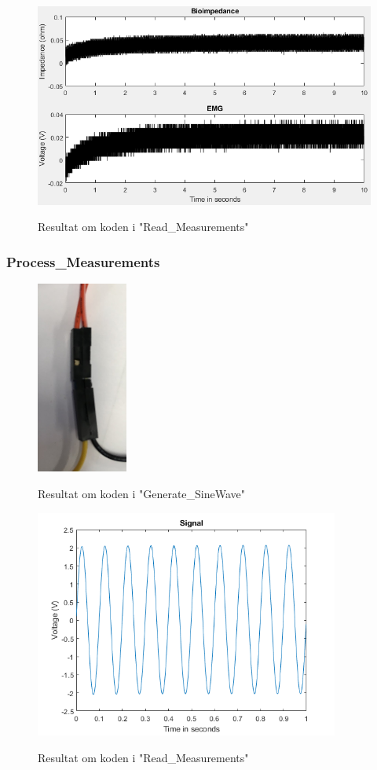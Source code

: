 \begin{figure}[H] 
\centering
{\includegraphics[width=\linewidth]
{Figure/modultestread}}
\caption{Resultat om koden i "Read\_Measurements"}
\label{fig:modultestread}
\end{figure}




\subsubsection{Process\_Measurements} 

\begin{figure}[H] 
\centering
{\includegraphics[width=3cm]
{Figure/modultestsinus2}}
\caption{Resultat om koden i "Generate\_SineWave"}
\label{fig:modultestsinus2}
\end{figure}

\begin{figure}[H] 
\centering
{\includegraphics[width=10cm]
{Figure/modultestprocessSignal}}
\caption{Resultat om koden i "Read\_Measurements"}
\label{fig:modultestprocessSignal}
\end{figure}

